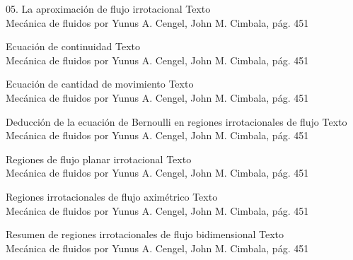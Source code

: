 
\begin{frame}{05. La aproximación de flujo irrotacional}
\justifying
Texto
\\
{\tiny Mecánica de fluidos por Yunus A. Cengel, John M. Cimbala, pág. 451}
\end{frame}


\begin{frame}{Ecuación de continuidad}
\justifying
Texto
\\
{\tiny Mecánica de fluidos por Yunus A. Cengel, John M. Cimbala, pág. 451}
\end{frame}


\begin{frame}{Ecuación de cantidad de movimiento}
\justifying
Texto
\\
{\tiny Mecánica de fluidos por Yunus A. Cengel, John M. Cimbala, pág. 451}
\end{frame}


\begin{frame}{Deducción de la ecuación de Bernoulli en regiones irrotacionales de flujo}
\justifying
Texto
\\
{\tiny Mecánica de fluidos por Yunus A. Cengel, John M. Cimbala, pág. 451}
\end{frame}


\begin{frame}{Regiones de flujo planar irrotacional}
\justifying
Texto
\\
{\tiny Mecánica de fluidos por Yunus A. Cengel, John M. Cimbala, pág. 451}
\end{frame}


\begin{frame}{Regiones irrotacionales de flujo aximétrico}
\justifying
Texto
\\
{\tiny Mecánica de fluidos por Yunus A. Cengel, John M. Cimbala, pág. 451}
\end{frame}


\begin{frame}{Resumen de regiones irrotacionales de flujo bidimensional}
\justifying
Texto
\\
{\tiny Mecánica de fluidos por Yunus A. Cengel, John M. Cimbala, pág. 451}
\end{frame}

